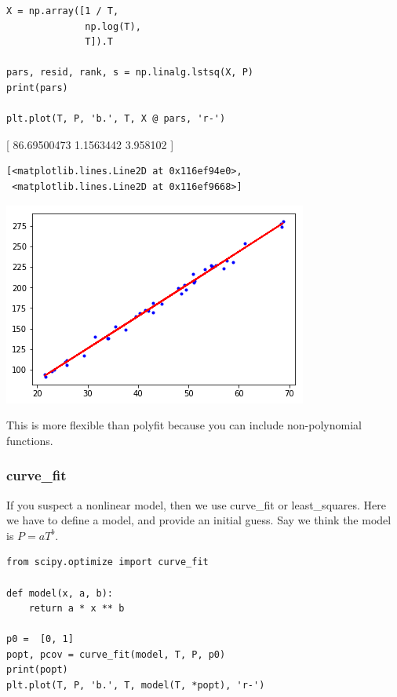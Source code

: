 \documentclass[11pt]{article}
\begin{document}
\begin{verbatim}
X = np.array([1 / T,
              np.log(T),
              T]).T

pars, resid, rank, s = np.linalg.lstsq(X, P)
print(pars)

plt.plot(T, P, 'b.', T, X @ pars, 'r-')
\end{verbatim}

[ 86.69500473   1.1563442    3.958102  ]

\begin{verbatim}
[<matplotlib.lines.Line2D at 0x116ef94e0>,
 <matplotlib.lines.Line2D at 0x116ef9668>]
\end{verbatim}



\begin{center}
\includegraphics[width=.9\linewidth]{obipy-resources/a10feaf5270288b4c795ebce6b64fde6-70304UUo.png}
\end{center}

This is more flexible than polyfit because you can include non-polynomial functions.

\subsubsection{curve\_fit}
\label{sec:orgdeafe3e}

If you suspect a nonlinear model, then we use curve\_fit or least\_squares. Here we have to define a model, and provide an initial guess. Say we think the model is \(P = a T^b\).

\begin{verbatim}
from scipy.optimize import curve_fit

def model(x, a, b):
    return a * x ** b

p0 =  [0, 1]
popt, pcov = curve_fit(model, T, P, p0)
print(popt)
plt.plot(T, P, 'b.', T, model(T, *popt), 'r-')
\end{verbatim}
\end{document}
